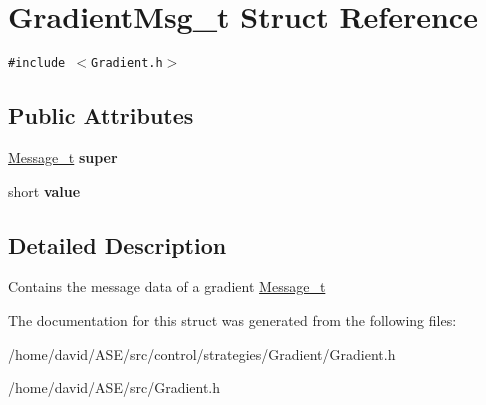 \hypertarget{structGradientMsg__t}{
\section{GradientMsg\_\-t Struct Reference}
\label{structGradientMsg__t}
}
{\tt \#include $<$Gradient.h$>$}

\subsection*{Public Attributes}
\begin{CompactItemize}
\item 
\hypertarget{structGradientMsg__t_956bdbe01b35b74630b602040d27ca9e}{
\hyperlink{structMessage__t}{Message\_\-t} \textbf{super}}
\label{structGradientMsg__t_956bdbe01b35b74630b602040d27ca9e}

\item 
\hypertarget{structGradientMsg__t_7086649daa8681fdcf42fb36dc07d84d}{
short \textbf{value}}
\label{structGradientMsg__t_7086649daa8681fdcf42fb36dc07d84d}

\end{CompactItemize}


\subsection{Detailed Description}
Contains the message data of a gradient  \hyperlink{structMessage__t}{Message\_\-t} 

The documentation for this struct was generated from the following files:\begin{CompactItemize}
\item 
/home/david/ASE/src/control/strategies/Gradient/Gradient.h\item 
/home/david/ASE/src/Gradient.h\end{CompactItemize}
